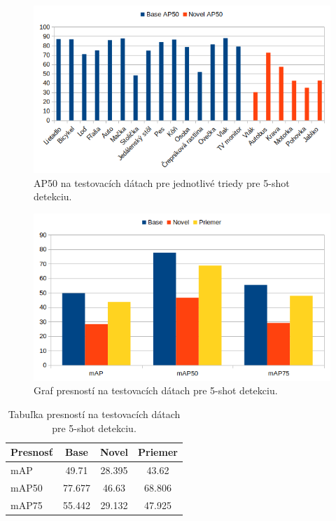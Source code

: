 \begin{figure}[H]
\includegraphics[width=\textwidth]{images/5_shot_classes_AP50.png}
\centering
\caption{AP50 na testovacích dátach pre jednotlivé triedy pre 5-shot detekciu.}
\label{fig:image28}
\end{figure}

\begin{figure}[H]
\includegraphics[width=\textwidth]{images/5_shot_meanAP.png}
\centering
\caption{Graf presností na testovacích dátach pre 5-shot detekciu.}
\label{fig:image30}
\end{figure}

\begin{table}[H]
\begin{tabular}{|l|c|c|c|}
\hline
\textbf{Presnosť} & \textbf{Base} & \textbf{Novel} & \textbf{Priemer} \\
\hline
mAP & 49.71 & 28.395 & 43.62 \\
mAP50 & 77.677 & 46.63 & 68.806 \\
mAP75 & 55.442 & 29.132 & 47.925 \\
\hline
\end{tabular}
\centering
\caption{Tabuľka presností na testovacích dátach pre 5-shot detekciu.}
\label{tab:table4}
\end{table}

